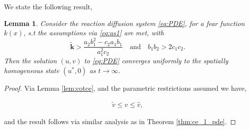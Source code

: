 \documentclass[10pt]{amsart}
\newtheorem{lemma}[theorem]{Lemma}
\theoremstyle{definition}
\begin{document}
We state the following result,
\begin{lemma}\label{lem:ce_1_pde-l}
	Consider the reaction diffusion system \eqref{eq:PDE}, for a fear function $k(x)$, s.t the assumptions via \eqref{eq:as1} are met, with  
	\[ \mathbf{\widetilde{k} }>\dfrac{a_2 b_1^2-c_2a_1b_1}{a_1^2c_2} \quad \text{and} \quad b_{1}b_{2} > 2 c_{1} c_{2}. \]
	Then the solution $(u,v)$ to \eqref{eq:PDE}  converges uniformly to the spatially homogeneous state $(u^*,0)$ as $t \to \infty$.
\end{lemma}



\begin{proof}
Via Lemma \ref{lem:cotce}, and the parametric restrictions assumed we have,

\begin{align*}
	\widetilde{v}	 \leq   v    \leq  \widehat{v},
	\end{align*}
	
	and the result follows via similar analysis as in Theorem \ref{thm:ce_1_pde}.
\end{proof}


%	  







	
%	
\end{document}
